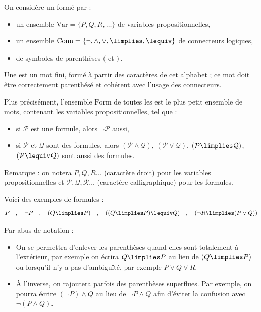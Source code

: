 \documentclass[11pt,class=report,crop=false]{standalone}
\begin{document}
On considère un  formé par :
\begin{itemize}
	\item un ensemble $\text{Var} = \{P, Q, R,\ldots\}$ de variables propositionnelles,
	
	\item un ensemble $\text{Conn} = \{ \lnot, \land, \lor, \limplies, \lequiv \}$ de connecteurs logiques,
	
	\item de symboles de parenthèses $($ et $)$\,.
\end{itemize}

Une  est un mot fini, formé à partir des caractères de cet alphabet ; ce mot doit être correctement parenthésé et cohérent avec l'usage des connecteurs.

\begin{definition}
Plus précisément, l'ensemble $\text{Form}$ de toutes les  est le plus petit ensemble de mots, contenant les variables propositionnelles, tel que :
\begin{itemize}
	\item si $\mathcal{P}$ est une formule, alors $\lnot \mathcal{P}$ aussi,
	\item si $\mathcal{P}$ et $\mathcal{Q}$ sont des formules, alors 
	$(\mathcal{P} \land \mathcal{Q})$, 
	$(\mathcal{P} \lor \mathcal{Q})$, 
	$(\mathcal{P} \limplies \mathcal{Q})$, 
	$(\mathcal{P} \lequiv \mathcal{Q})$ sont aussi des formules.
\end{itemize}
\end{definition}

Remarque : on notera $P, Q, R\ldots$ (caractère droit) pour les variables propositionnelles et 
$\mathcal{P}, \mathcal{Q}, \mathcal{R}\ldots$ (caractère calligraphique) pour les formules.

Voici des exemples de formules :
\[
P \quad, \quad 
\lnot P \quad, \quad 
(Q \limplies P) \quad, \quad 
((Q \limplies P) \lequiv Q) \quad, \quad 
(\lnot R \limplies (P \lor Q))
\]

Par abus de notation :
\begin{itemize}
	\item On se permettra d'enlever les parenthèses quand elles sont totalement à l'extérieur, par exemple on écrira $Q \limplies P$  au lieu de $(Q \limplies P)$ ou lorsqu'il n'y a pas d’ambiguïté, par exemple $P \lor Q \lor R$.
	
	\item À l'inverse, on rajoutera parfois des parenthèses superflues. Par exemple, on pourra écrire $(\lnot P) \land Q$ au lieu de $\lnot P \land Q$ afin d'éviter la confusion avec $\lnot (P \land Q)$.
\end{itemize}
\end{document}

